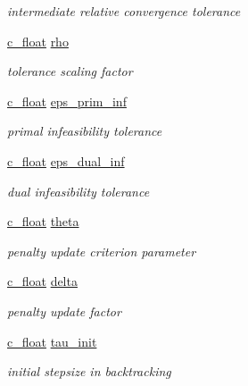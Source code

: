 \begin{DoxyCompactItemize}
\begin{DoxyCompactList}\small\item\em intermediate relative convergence tolerance \end{DoxyCompactList}\item 
\mbox{\hyperlink{global__opts_8h_a7f1a9fda95e52979658c20a0d134fb15}{c\+\_\+float}} \mbox{\hyperlink{structQPALMSettings_a39d647ae87752808f0a33ab020dd0591}{rho}}
\begin{DoxyCompactList}\small\item\em tolerance scaling factor \end{DoxyCompactList}\item 
\mbox{\hyperlink{global__opts_8h_a7f1a9fda95e52979658c20a0d134fb15}{c\+\_\+float}} \mbox{\hyperlink{structQPALMSettings_a79fa6519420bf0a0078a67a4d9bb57f3}{eps\+\_\+prim\+\_\+inf}}
\begin{DoxyCompactList}\small\item\em primal infeasibility tolerance \end{DoxyCompactList}\item 
\mbox{\hyperlink{global__opts_8h_a7f1a9fda95e52979658c20a0d134fb15}{c\+\_\+float}} \mbox{\hyperlink{structQPALMSettings_a2a5fb667474a46bcc38c61b0470965e6}{eps\+\_\+dual\+\_\+inf}}
\begin{DoxyCompactList}\small\item\em dual infeasibility tolerance \end{DoxyCompactList}\item 
\mbox{\hyperlink{global__opts_8h_a7f1a9fda95e52979658c20a0d134fb15}{c\+\_\+float}} \mbox{\hyperlink{structQPALMSettings_a5823b01f86bd67a2c5fac3f03749db2c}{theta}}
\begin{DoxyCompactList}\small\item\em penalty update criterion parameter \end{DoxyCompactList}\item 
\mbox{\hyperlink{global__opts_8h_a7f1a9fda95e52979658c20a0d134fb15}{c\+\_\+float}} \mbox{\hyperlink{structQPALMSettings_a1bf9e088b59e076c100ce03da4431181}{delta}}
\begin{DoxyCompactList}\small\item\em penalty update factor \end{DoxyCompactList}\item 
\mbox{\hyperlink{global__opts_8h_a7f1a9fda95e52979658c20a0d134fb15}{c\+\_\+float}} \mbox{\hyperlink{structQPALMSettings_aea063df79b1f7d5fa38d0bf77c9e5d7a}{tau\+\_\+init}}
\begin{DoxyCompactList}\small\item\em initial stepsize in backtracking \end{DoxyCompactList}\item 

\end{DoxyCompactItemize}
